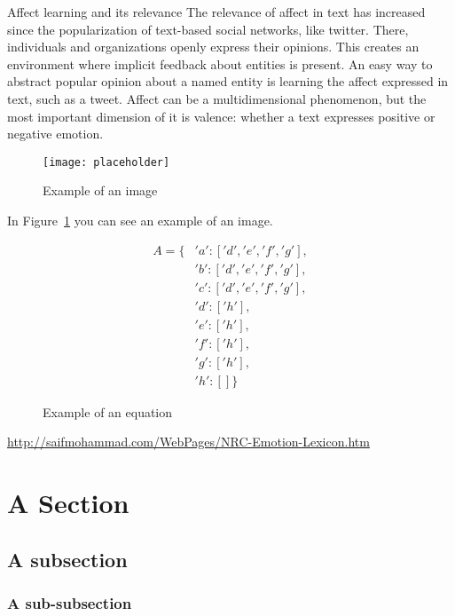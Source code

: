Affect learning and its relevance
The relevance of affect in text has increased since the popularization of text-based social networks, like twitter. There, individuals and organizations openly express their opinions. This creates an environment where implicit feedback about entities is present. An easy way to abstract popular opinion about a named entity is learning the affect expressed in text, such as a tweet. Affect can be a multidimensional phenomenon, but the most important dimension of it is valence: whether a text expresses positive or negative emotion.





\begin{figure}[H]
  \texttt{[image: placeholder]}
  \centering
  \caption{Example of an image}
  \label{fig:placeholder}
\end{figure}


In Figure~\ref{fig:placeholder} you can see an example of an image.


\begin{figure}[H]
  \begin{equation} \label{eq:equation_placeholder}
    \begin{split}
      A = \{&'a':['d','e','f','g'], \\
           &'b':['d','e','f','g'], \\
           &'c':['d','e','f','g'], \\
           &'d':['h'], \\
           &'e':['h'], \\
           &'f':['h'], \\
           &'g':['h'], \\
           &'h':[] \}
    \end{split}
  \end{equation}
  \caption{Example of an equation}
  \label{fig:equation_placeholder}
\end{figure}


\url{http://saifmohammad.com/WebPages/NRC-Emotion-Lexicon.htm}


\section{A Section}
\label{sec:A Section}


\subsection{A subsection}
\label{sub:A subsection}


\subsubsection{A sub-subsection}
\label{subs:A sub-subsection}
